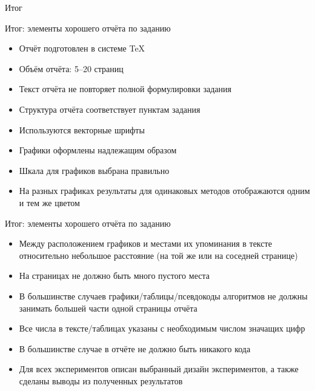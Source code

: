 \documentclass[fleqn, xcolor=x11names]{beamer}
\begin{document}
\begin{section}{Итог}

\begin{frame}{Итог: элементы хорошего отчёта по заданию}
\begin{itemize}
    \item Отчёт подготовлен в системе \TeX
    \item Объём отчёта: 5--20 страниц
    \item Текст отчёта не повторяет полной формулировки задания
    \item Структура отчёта соответствует пунктам задания
    \item Используются векторные шрифты
    \item Графики оформлены надлежащим образом
    \item Шкала для графиков выбрана правильно
    \item На разных графиках результаты для одинаковых методов отображаются одним и тем же цветом
\end{itemize}
\end{frame}

\begin{frame}{Итог: элементы хорошего отчёта по заданию}
\begin{itemize}
\item Между расположением графиков и местами их упоминания в тексте относительно небольшое расстояние (на той же или на соседней странице)
\item На страницах не должно быть много пустого места
\item В большинстве случаев графики/таблицы/псевдокоды алгоритмов не должны занимать большей части одной страницы отчёта
\item Все числа в тексте/таблицах указаны с необходимым числом значащих цифр
\item В большинстве случае в отчёте не должно быть никакого кода
\item Для всех экспериментов описан выбранный дизайн экспериментов, а также сделаны выводы из полученных результатов
\end{itemize}
\end{frame}

\end{section}
\end{document}
